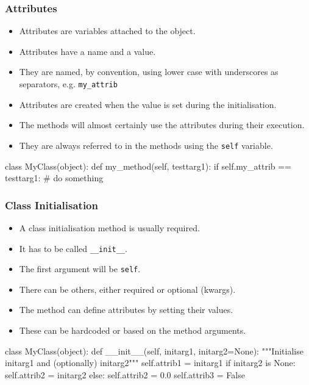 \documentclass{beamer}
\begin{document}
\begin{frame}[fragile]
\frametitle{Attributes}

\begin{itemize}
\item Attributes are variables attached to the object.
\item Attributes have a name and a value.
\item They are named, by convention, using lower case with underscores as separators, 
e.g. \lstinline|my_attrib|
\item Attributes are created when the value is set during the initialisation.
\item The methods will almost certainly use the attributes during their execution.
\item They are always referred to in the methods using the \lstinline|self| variable.
\end{itemize}
\begin{code}
class MyClass(object):
  def my_method(self, testtarg1):
    if self.my_attrib == testtarg1:
      # do something
\end{code}
\end{frame}

\begin{frame}[fragile]
\frametitle{Class Initialisation}
\begin{itemize}
\item A class initialisation method is usually required.
\item It has to be called \lstinline|__init__|.
\item The first argument will be \lstinline|self|. 
\item There can be others, either required or optional (kwargs).
\item The method can define attributes by setting their values.
\item These can be hardcoded or based on the method arguments.
\end{itemize}

\begin{code}
class MyClass(object):
  def __init__(self, initarg1, initarg2=None):
    """Initialise initarg1 and (optionally) initarg2"""
    self.attrib1 = initarg1
    if initarg2 is None:
      self.attrib2 = initarg2
    else:
      self.attrib2 = 0.0
    self.attrib3 = False
\end{code}

\end{frame}
\end{document}
